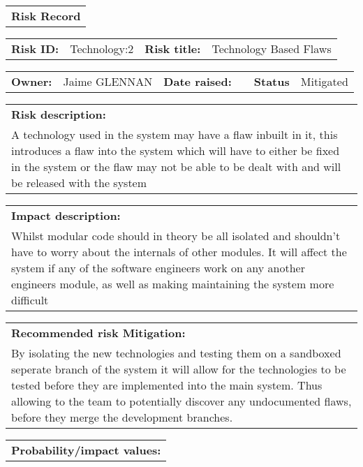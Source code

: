 \begin{table}
	\begin{tabularx}{\textwidth}{| X |}
		\hline
		\textbf{Risk Record}
	\end{tabularx}
	\begin{tabularx}{\textwidth}{| l | X | l | X |}
		\hline
		\textbf{Risk ID:} & Technology:2 & \textbf{Risk title:} & Technology Based Flaws \\
	\end{tabularx}
	\begin{tabularx}{\textwidth}{| l | X | l | X | l | X |}
		\hline
		\textbf{Owner:} & Jaime GLENNAN & \textbf{Date raised:} &  & \textbf{Status} & Mitigated \\
	\end{tabularx}
	\begin{tabularx}{\textwidth}{| X |}
		\hline
		\textbf{Risk description:} \\ A technology used in the system may have a flaw inbuilt in it, this introduces a flaw into the system which will have to either be fixed in the system or the flaw may not be able to be dealt with and will be released with the system \\
	\end{tabularx}
	\begin{tabularx}{\textwidth}{| X |}
		\hline
		\textbf{Impact description:} \\ Whilst modular code should in theory be all isolated and shouldn't have to worry about the internals of other modules. It will affect the system if any of the software engineers work on any another engineers module, as well as making maintaining the system more difficult \\
	\end{tabularx}
	\begin{tabularx}{\textwidth}{| X |}
		\hline
		\textbf{Recommended risk Mitigation:} \\ By isolating the new technologies and testing them on a sandboxed seperate branch of the system it will allow for the technologies to be tested before they are implemented into the main system. Thus allowing to the team to potentially discover any undocumented flaws, before they merge the development branches. \\
	\end{tabularx}
	\begin{tabularx}{\textwidth}{| X |}
		\hline
		\textbf{Probability/impact values:} \\
	\end{tabularx}

\end{table}
